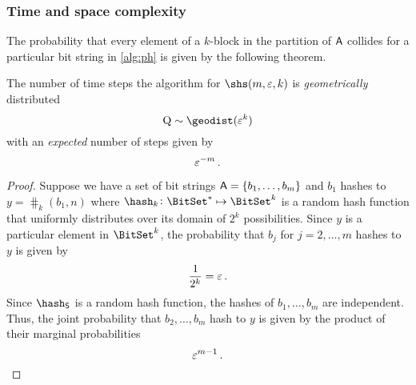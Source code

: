 \documentclass[ ../main.tex]{subfiles}
\begin{document}
\subsubsection{Time and space complexity}
The probability that every element of a $k$-block in the partition of $\Set{A}$ collides for a particular bit string in \cref{alg:ph} is given by the following theorem.
\begin{theorem}
    The number of time steps the algorithm for $\shs(m,\fprate,k)$ is \emph{geometrically} distributed
    \begin{equation}
        \RV{Q} \sim \geodist(\fprate^{k})
    \end{equation}
    with an \emph{expected} number of steps given by
    \begin{equation}
        \label{eq:p_m_N}
        \varepsilon^{-m}\,.
    \end{equation}
\end{theorem}
\begin{proof}
    Suppose we have a set of bit strings $\Set{A} = \{b_1,\ldots,b_m\}$ and $b_1$ hashes to $y = \hash_k(b_1,n)$ where $\hash_k \colon \BitSet^{*} \mapsto \BitSet^k$ is a random hash function that uniformly distributes over its domain of $2^k$ possibilities.
    Since $y$ is a particular element in $\BitSet^k$, the probability that $b_j$ for $j=2,\ldots,m$ hashes to $y$ is given by
    \begin{equation}
        \frac{1}{2^k} = \varepsilon\,.
    \end{equation}
    Since $\hash_{\Set{S}}$ is a random hash function, the hashes of $b_1,\ldots,b_m$ are independent.
    Thus, the joint probability that $b_2, \ldots, b_m$ hash to $y$ is given by the product of their marginal probabilities
    \begin{equation}
        \varepsilon^{m-1}\,.
    \end{equation}
\end{proof}
\end{document}
